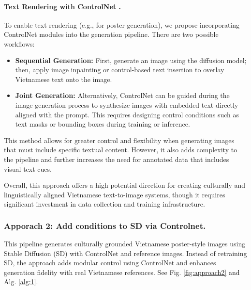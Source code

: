 \documentclass[conference]{IEEEtran}
\begin{document}
\paragraph{Text Rendering with ControlNet \cite{controlnet2023}.} To enable text rendering (e.g., for poster generation), we propose incorporating ControlNet modules into the generation pipeline. There are two possible workflows:
\begin{itemize}
	\item \textbf{Sequential Generation:} First, generate an image using the diffusion model; then, apply image inpainting or control-based text insertion to overlay Vietnamese text onto the image.
	\item \textbf{Joint Generation:} Alternatively, ControlNet can be guided during the image generation process to synthesize images with embedded text directly aligned with the prompt. This requires designing control conditions such as text masks or bounding boxes during training or inference.
\end{itemize}

This method allows for greater control and flexibility when generating images that must include specific textual content. However, it also adds complexity to the pipeline and further increases the need for annotated data that includes visual text cues.

Overall, this approach offers a high-potential direction for creating culturally and linguistically aligned Vietnamese text-to-image systems, though it requires significant investment in data collection and training infrastructure.

\subsubsection{Apporach 2: Add conditions to SD via Controlnet.}

This pipeline generates culturally grounded Vietnamese poster-style images using Stable Diffusion (SD) with ControlNet and reference images. Instead of retraining SD, the approach adds modular control using ControlNet and enhances generation fidelity with real Vietnamese references. See Fig. \ref{fig:approach2} and Alg. \ref{alg:1}.
\end{document}
